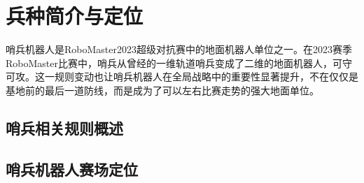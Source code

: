 
\chapter{兵种简介与定位}

哨兵机器人是RoboMaster2023超级对抗赛中的地面机器人单位之一。在2023赛季RoboMaster比赛中，哨兵从曾经的一维轨道哨兵变成了二维的地面机器人，可守可攻。这一规则变动也让哨兵机器人在全局战略中的重要性显著提升，不在仅仅是基地前的最后一道防线，而是成为了可以左右比赛走势的强大地面单位。

\section{哨兵相关规则概述}

\section{哨兵机器人赛场定位}